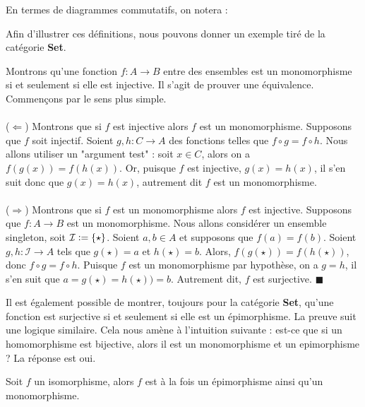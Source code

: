 \documentclass{article}
\begin{document}
\noindent
En termes de diagrammes commutatifs, on notera :

\begin{center}
\end{center}

Afin d'illustrer ces définitions, nous pouvons donner un exemple tiré de la catégorie \textbf{Set}.

\begin{example}[]{}
    Montrons qu'une fonction $f:A\to B$ entre des ensembles est un monomorphisme si et seulement si elle est injective. Il s'agit de prouver une équivalence. Commençons par le sens plus simple.\\\\
    \noindent
    ($\pmb\Leftarrow$) Montrons que si $f$ est injective alors $f$ est un monomorphisme. Supposons que $f$ soit injectif. Soient $g, h:C\to A$ des fonctions telles que $f\circ g= f\circ h$. Nous allons utiliser un "argument test" : soit $x\in C$, alors on a $f(g(x))=f(h(x))$. Or, puisque $f$ est injective, $g(x)=h(x)$, il s'en suit donc que $g(x)=h(x)$, autrement dit $f$ est un monomorphisme.\\\\
    \noindent
    ($\pmb\Rightarrow$) Montrons que si $f$ est un monomorphisme alors $f$ est injective. Supposons que $f:A\to B$ est un monomorphisme. Nous allons considérer un ensemble singleton, soit $\mathcal I\vcentcolon=\{\star\}$. Soient $a, b\in A$ et supposons que $f(a)=f(b)$. Soient $g, h:\mathcal I\to A$ tels que $g(\star)=a$ et $h(\star)=b$. Alors, $f(g(\star))=f(h(\star))$, donc $f\circ g=f\circ h$. Puisque $f$ est un monomorphisme par hypothèse, on a $g=h$, il s'en suit que $a=g(\star)=h(\star))=b$. Autrement dit, $f$ est surjective.
    $\blacksquare$
\end{example}

Il est également possible de montrer, toujours pour la catégorie \textbf{Set}, qu'une fonction est surjective si et seulement si elle est un épimorphisme. La preuve suit une logique similaire. Cela nous amène à l'intuition suivante : est-ce que si un homomorphisme est bijective, alors il est un monomorphisme et un epimorphisme ? La réponse est oui.

\begin{lemma}{}
    Soit $f$ un isomorphisme, alors $f$ est à la fois un épimorphisme ainsi qu'un monomorphisme.
\end{lemma}
\end{document}
